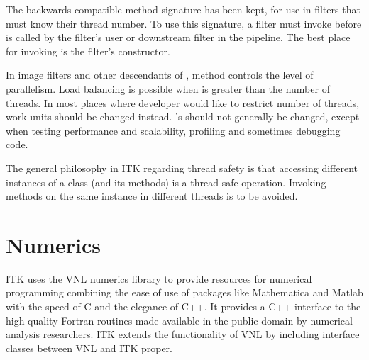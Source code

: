 The backwards compatible  method
signature has been kept, for use in filters that must know their thread number.
To use this signature, a filter must invoke
 before  is called by
the filter's user or downstream filter in the pipeline. The best place for
invoking  is the filter's constructor.

In image filters and other descendants of , method
 controls the level of parallelism.
Load balancing is possible when  is greater
than the number of threads. In most places where developer would like to
restrict number of threads, work units should be changed instead.
's  should not
generally be changed, except when testing performance and scalability,
profiling and sometimes debugging code.

The general philosophy in ITK regarding thread safety is that accessing
different instances of a class (and its methods) is a thread-safe operation.
Invoking methods on the same instance in different threads is to be avoided.


\section{Numerics}%
\label{sec:Numerics}%
%

ITK uses the VNL numerics library to provide resources for numerical
programming combining the ease of use of packages like Mathematica and Matlab
with the speed of C and the elegance of C++. It provides a C++ interface to
the high-quality Fortran routines made available in the public domain by
numerical analysis researchers. ITK extends the functionality of VNL
by including interface classes between VNL and ITK proper.

